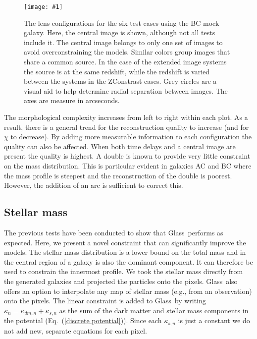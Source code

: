 \documentclass[onecolumn,galley]{mn2e}
\newcommand{\Glass}{{\sc Glass}}
\newcommand{\eqnref}[1] {Eq.~(\ref{#1})}
\newcommand\plotone[1]{%
 \centering
 \leavevmode
 \texttt{[image: \#1]}%
}%
\begin{document}
\begin{figure}
\plotone{BCarrival_surfaces}
\caption{The lens configurations for the six test cases using the BC mock galaxy. Here,
the central image is shown, although not all tests include it. The central image belongs
to only one set of images to avoid overconstraining the models. Similar colors group
images that share a common source. In the case of the extended image systems the source
is at the same redshift, while the redshift is varied between the systems in the 
ZConstrast cases. Grey circles are a visual aid to help determine radial separation
between images. The axes are measure in arcseconds.}
\label{reconstruction}
\end{figure}

The morphological complexity increases from left to right within each plot. As
a result, there is a general trend for the reconstruction quality to increase
(and for $\chi$ to decrease). By adding more measurable information to each
configuration the quality can also be affected. When both time delays and a
central image are present the quality is highest. A double is known to provide
very little constraint on the mass distribution. This is particular evident in
galaxies AC and BC where the mass profile is steepest and the reconstruction of
the double is poorest. However, the addition of an arc is sufficient to correct
this.

\subsection{Stellar mass}
\label{stellar mass}

The previous tests have been conducted to show that \Glass\ performs as expected.
Here, we present a novel constraint that can significantly improve the models. 
The stellar mass distribution is a lower bound on the total mass and in the
central region of a galaxy is also the dominant component. It can therefore be
used to constrain the innermost profile. We took the stellar mass directly from
the generated galaxies and projected the particles onto the pixels. \Glass\
also offers an option to interpolate any map of stellar mass (e.g., from an
observation) onto the pixels. The linear constraint is added to \Glass\ by
writing $\kappa_n = \kappa_{dm,n} + \kappa_{s,n}$ as the sum of the
dark matter and stellar mass components in the potential (\eqnref{discrete
potential}). Since each $\kappa_{s,n}$ is just a constant we do not add new,
separate equations for each pixel. 
\end{document}
